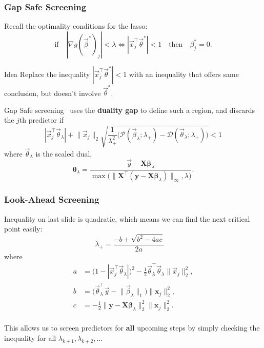 \documentclass[10pt]{beamer}
\begin{document}
\begin{frame}[c]
  \frametitle{Gap Safe Screening}

  Recall the optimality conditions for the lasso:
  \[
    \text{if} \quad |\nabla g(\vec{\beta}^*)_j| < \lambda \iff |\vec{x}_j^\intercal \vec{\theta}^*| < 1 \quad \text{then}\quad \beta_j^* = 0.
  \]

  \pause

  \begin{exampleblock}{Idea}
    Replace the inequality \(|\vec{x}_j^\intercal \vec{\theta}^*| < 1\) with an inequality
    that offers same conclusion, but doesn't involve \(\vec{\theta}^*\).
  \end{exampleblock}


  \medskip\pause

  Gap Safe screening~\parencite{fercoq2015} uses the \textbf{duality gap} to define such a
  region, and discards the \(j\)th predictor if
  \begin{equation*}
    |\vec{x}_j^\intercal \vec{\theta}_\lambda| + \lVert \vec{x}_j\rVert_2
    \sqrt{
      \frac{1}{\lambda_+^2}
      \big(\mathcal{P}(\vec{\beta}_\lambda; \lambda_+) -
      \mathcal{D}(\vec{\theta}_\lambda; \lambda_+)\big)
    }
    < 1
  \end{equation*}
  where \(\vec{\theta}_\lambda\) is the \alert{scaled} dual,
  \[
    \bm{\theta}_\lambda = \frac{\vec{y} - \bm{X\beta}_\lambda}{
      \max\big( \lVert \bm{X}^\intercal(\bm{y} - \bm{X\beta}_\lambda)\rVert_\infty, \lambda\big)}.
  \]
\end{frame}

\begin{frame}[c]
  \frametitle{Look-Ahead Screening}
  Inequality on last slide is \alert{quadratic}, which means we can find the next
  critical point easily:
  \[
    \lambda_+ = \frac{-b \pm \sqrt{b^2 - 4ac}}{2a} \quad
  \]
  where
  \[
    \begin{aligned}
      a & = \big( 1 - | \vec{x}_j^\intercal \vec{\theta}_\lambda|\big)^2 -
      \frac 12 \vec{\theta}_\lambda^\intercal \vec{\theta}_\lambda \lVert \vec{x}_j\rVert_2^2,     \\
      b & = \big(\vec{\theta}_\lambda^\intercal \vec{y} - \lVert \vec{\beta}_\lambda \rVert_1\big)
      \lVert \bm{x}_j \rVert_2^2,                                                                  \\
      c & = - \frac 12 \lVert \bm{y} - \bm{X\beta}_\lambda\rVert_2^2
      \lVert \bm{x}_j\rVert_2^2.                                                                   \\
    \end{aligned}
  \]

  \medskip\pause

  This allows us to screen predictors for \textbf{all} upcoming steps by simply checking the
  inequality for all \(\lambda_{k +1},\lambda_{k + 2}, \dots\)
\end{frame}
\end{document}
